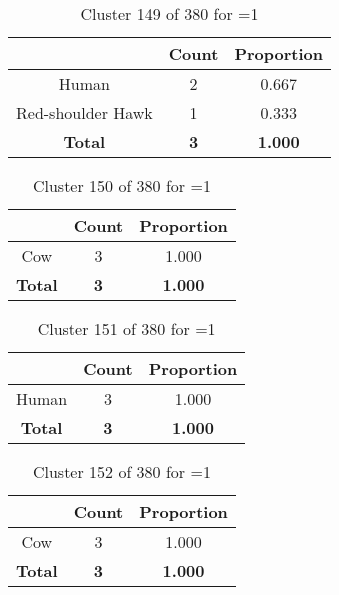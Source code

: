\begin{table}[ht!]
\centering
\begin{tabular}{|c|c|c|}
\hline
\bf \Spec{} &\bf Count &\bf Proportion\\ \hline \hline
Human & 2 & 0.667\\ \hline
Red-shoulder Hawk & 1 & 0.333\\ \hline
\hline
\bf Total & \bf 3 & \bf 1.000\\ \hline
\end{tabular}
\label{tab:cluster:149:1}
\caption{Cluster 149 of 380 for \minneigh{}=1}
\end{table}

\clearpage
\begin{table}[ht!]
\centering
\begin{tabular}{|c|c|c|}
\hline
\bf \Spec{} &\bf Count &\bf Proportion\\ \hline \hline
Cow & 3 & 1.000\\ \hline
\hline
\bf Total & \bf 3 & \bf 1.000\\ \hline
\end{tabular}
\label{tab:cluster:150:1}
\caption{Cluster 150 of 380 for \minneigh{}=1}
\end{table}

\begin{table}[ht!]
\centering
\begin{tabular}{|c|c|c|}
\hline
\bf \Spec{} &\bf Count &\bf Proportion\\ \hline \hline
Human & 3 & 1.000\\ \hline
\hline
\bf Total & \bf 3 & \bf 1.000\\ \hline
\end{tabular}
\label{tab:cluster:151:1}
\caption{Cluster 151 of 380 for \minneigh{}=1}
\end{table}

\begin{table}[ht!]
\centering
\begin{tabular}{|c|c|c|}
\hline
\bf \Spec{} &\bf Count &\bf Proportion\\ \hline \hline
Cow & 3 & 1.000\\ \hline
\hline
\bf Total & \bf 3 & \bf 1.000\\ \hline
\end{tabular}
\label{tab:cluster:152:1}
\caption{Cluster 152 of 380 for \minneigh{}=1}
\end{table}

